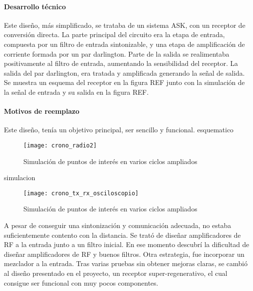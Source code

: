 \paragraph{Desarrollo técnico}
Este diseño, más simplificado, se trataba de un sistema ASK, con un receptor de conversión directa. 
La parte principal del circuito era la etapa de entrada, compuesta por un filtro de entrada sintonizable, y una etapa de amplificación de corriente formada por un par darlington. Parte de la salida se realimentaba positivamente al filtro de entrada, aumentando la sensibilidad del receptor. La salida del par darlington, era tratada y amplificada generando la señal de salida. 
Se muestra un esquema del receptor en la figura REF junto con la simulación de la señal de entrada y su salida en la figura REF.
\paragraph{Motivos de reemplazo}
Este diseño, tenía un objetivo principal, ser sencillo y funcional.
esquematico
\begin{figure}[h]
    \centering
    \texttt{[image: crono\_radio2]}
    \caption{Simulación de puntos de interés en varios ciclos ampliados}
    \label{fig:simrx_zoom}
\end{figure}
simulacion
\begin{figure}[h]
    \centering
    \texttt{[image: crono\_tx\_rx\_osciloscopio]}
    \caption{Simulación de puntos de interés en varios ciclos ampliados}
    \label{fig:simrx_zoom}
\end{figure}
A pesar de conseguir una sintonización y comunicación adecuada, no estaba suficientemente contento con la distancia. Se trató de diseñar amplificadores de RF a la entrada junto a un filtro inicial. En ese momento descubrí la dificultad de diseñar amplificadores de RF y buenos filtros. Otra estrategia, fue incorporar un mezclador a la entrada. Tras varias pruebas sin obtener mejoras claras, se cambió al diseño presentado en el proyecto, un receptor super-regenerativo, el cual consigue ser funcional con muy pocos componentes.
